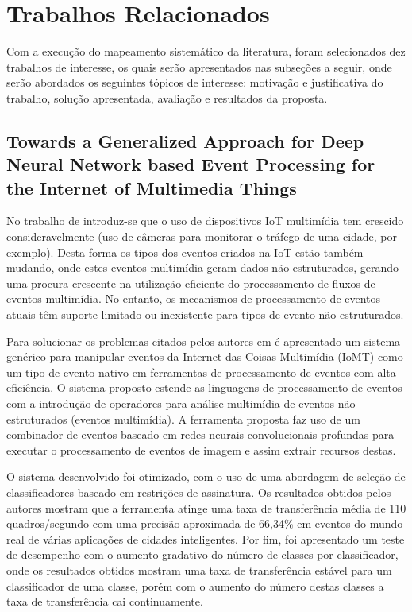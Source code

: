 \documentclass[ti,table]{texufpel} %
\begin{document}
\section{Trabalhos Relacionados} 

Com a execução do mapeamento sistemático da literatura, foram selecionados dez trabalhos de interesse, os quais serão apresentados nas subseções a seguir, onde serão abordados os seguintes tópicos de interesse: motivação e justificativa do trabalho, solução apresentada, avaliação e resultados da proposta. 

  

  


\subsection{Towards a Generalized Approach for Deep Neural Network based Event Processing for the Internet of Multimedia Things} 

  

  

    No trabalho de \cite{art1aslam2018towards} introduz-se que o uso de dispositivos IoT multimídia tem crescido consideravelmente (uso de câmeras para monitorar o tráfego de uma cidade, por exemplo). Desta forma os tipos dos eventos criados na IoT estão também mudando, onde estes eventos multimídia geram dados não estruturados, gerando uma procura crescente na utilização eficiente do processamento de fluxos de eventos multimídia. No entanto, os mecanismos de processamento de eventos atuais têm suporte limitado ou inexistente para tipos de evento não estruturados. 

     

    Para solucionar os problemas citados pelos autores em \cite{art1aslam2018towards} é apresentado um sistema genérico para manipular eventos da Internet das Coisas Multimídia (IoMT) como um tipo de evento nativo em ferramentas de processamento de eventos com alta eficiência. O sistema proposto estende as linguagens de processamento de eventos com a introdução de operadores para análise multimídia de eventos não estruturados (eventos multimídia). A ferramenta proposta faz uso de um combinador de eventos baseado em redes neurais convolucionais profundas para executar o processamento de eventos de imagem e assim extrair recursos destas. 

     

     O sistema desenvolvido foi otimizado, com o uso de uma abordagem de seleção de classificadores baseado em restrições de assinatura. Os resultados obtidos pelos autores mostram que a ferramenta atinge uma taxa de transferência média de 110 quadros/segundo com uma precisão aproximada de 66,34\% em eventos do mundo real de várias aplicações de cidades inteligentes. Por fim, foi apresentado um teste de desempenho com o aumento gradativo do número de classes por classificador, onde os resultados obtidos mostram uma taxa de transferência estável para um classificador de uma classe, porém com o aumento do número destas classes a taxa de transferência cai continuamente.   
\end{document}
